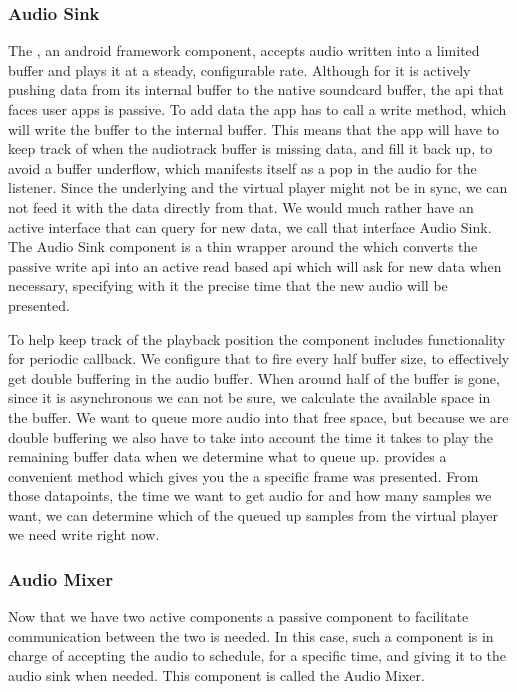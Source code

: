 \subsubsection{Audio Sink}\label{subsubsec:audiotrack}

The , an android framework component, accepts audio
written into a limited buffer and plays it at a steady, configurable
rate. Although for it is actively pushing data from its internal buffer
to the native soundcard buffer, the api that faces user apps is passive.
To add data the app has to call a write method, which will write the
buffer to the internal  buffer. This means that the app
will have to keep track of when the audiotrack buffer is missing data,
and fill it back up, to avoid a buffer underflow, which manifests itself
as a pop in the audio for the listener. Since the underlying
 and the virtual player might not be in sync, we can not
feed it with the data directly from that. We would much rather have an
active interface that can query for new data, we call that interface
Audio Sink. The Audio Sink component is a thin wrapper around the
 which converts the passive write api into an active
read based api which will ask for new data when necessary, specifying
with it the precise time that the new audio will be presented.

To help keep track of the playback position the 
component includes functionality for periodic callback. We configure
that to fire every half buffer size, to effectively get double buffering
in the audio buffer. When around half of the buffer is gone, since it is
asynchronous we can not be sure, we calculate the available space in the
buffer. We want to queue more audio into that free space, but because we
are double buffering we also have to take into account the time it takes
to play the remaining buffer data when we determine what to queue up.
 provides a convenient  method which
gives you the  a specific frame was presented. From those
datapoints, the time we want to get audio for and how many samples we
want, we can determine which of the queued up samples from the virtual
player we need write right now.

\subsubsection{Audio Mixer}\label{subsubsec:audiomixer}

Now that we have two active components a passive component to
facilitate communication between the two is needed. In this case, such
a component is in charge of accepting the audio to schedule, for
a specific time, and giving it to the audio sink when needed. This
component is called the Audio Mixer.

